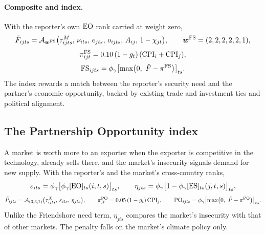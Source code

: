 \paragraph{Composite and index.} With the reporter's own $\mathrm{EO}$ rank carried at weight zero,
\begin{equation}\label{eq:fs_raw}
  \tilde F_{ijts}=\mathcal{A}_{\bm w^{\mathrm{FS}}}\bigl(\tau^{M}_{ijts},\,\nu_{its},\,e_{jts},\,o_{ijts},\,
  A_{ij},\,1-\chi_{jt}\bigr),\qquad \bm w^{\mathrm{FS}}=(2,2,2,2,2,1),
\end{equation}
\begin{equation}\label{eq:fs_penalty}
  \pi^{\mathrm{FS}}_{ijt}=0.10\,(1-g_t)\,(\mathrm{CPI}_i+\mathrm{CPI}_j),
\end{equation}
\begin{equation}\label{eq:fs_index}
  \mathrm{FS}_{ijts}={\phi_{\gamma}}\bigl[\max\bigl(0,\ \tilde F-\pi^{\mathrm{FS}}\bigr)\bigr]_{ts}.
\end{equation}
The index rewards a match between the reporter's security need and the partner's economic
opportunity, backed by existing trade and investment ties and political alignment.

\subsection{The Partnership Opportunity index}\label{subsec:partnership_opportunity}

A market is worth more to an exporter when the exporter is competitive in the technology, already
sells there, and the market's insecurity signals demand for new supply. With the reporter's and the
market's cross-country ranks,
\begin{equation}\label{eq:po_components}
  \varepsilon_{its}={\phi_{\gamma}}\bigl[{\phi_{\gamma}}[\mathrm{EO}]_{ts}(i,t,s)\bigr]_{ts},\qquad
  \eta_{jts}={\phi_{\gamma}}\bigl[1-{\phi_{\gamma}}[\mathrm{ES}]_{ts}(j,t,s)\bigr]_{ts},
\end{equation}
\begin{equation}\label{eq:po_index}
  \tilde P_{ijts}=\mathcal{A}_{(3,3,1)}\bigl(\tau^{X}_{ijts},\,\varepsilon_{its},\,\eta_{jts}\bigr),
  \qquad
  \pi^{\mathrm{PO}}_{jt}=0.05\,(1-g_t)\,\mathrm{CPI}_j,
  \qquad
  \mathrm{PO}_{ijts}={\phi_{\gamma}}\bigl[\max\bigl(0,\ \tilde P-\pi^{\mathrm{PO}}\bigr)\bigr]_{ts}.
\end{equation}
Unlike the Friendshore need term, $\eta_{jts}$ compares the market's insecurity with that of other
markets. The penalty falls on the market's climate policy only.

